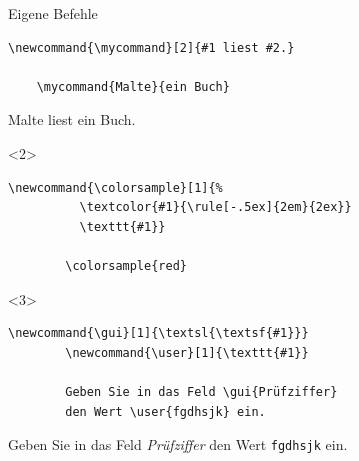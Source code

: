 \begin{Frame}[t,fragile]{Eigene Befehle}

  \xxx

  \begin{lstlisting}[gobble=4,moretexcs={mycommand}]
    \newcommand{\mycommand}[2]{#1 liest #2.}

    \mycommand{Malte}{ein Buch}
  \end{lstlisting}
  \newcommand{\mycommand}[2]{#1 liest #2.}
  \mycommand{Malte}{ein Buch}

  \xxx

  \begin{onlyenv}<2>
    \begin{Beispiel}
      \begin{lstlisting}[gobble=8,style=block,moretexcs={colorsample}]
        \newcommand{\colorsample}[1]{%
          \textcolor{#1}{\rule[-.5ex]{2em}{2ex}}
          \texttt{#1}}

        \colorsample{red}
      \end{lstlisting}

      \xxx

    \end{Beispiel}
  \end{onlyenv}

  \begin{onlyenv}<3>
    \begin{Beispiel}
      \begin{lstlisting}[gobble=8,style=block,moretexcs={user,gui}]
        \newcommand{\gui}[1]{\textsl{\textsf{#1}}}
        \newcommand{\user}[1]{\texttt{#1}}

        Geben Sie in das Feld \gui{Prüfziffer}
        den Wert \user{fgdhsjk} ein.
      \end{lstlisting}

      \newcommand{\gui}[1]{\textsl{\textsf{#1}}}
      \newcommand{\user}[1]{\texttt{#1}}

      \xxx

      \textrm{Geben Sie in das Feld \gui{Prüfziffer}
      den Wert \user{fgdhsjk} ein.}
    \end{Beispiel}
  \end{onlyenv}
\end{Frame}

